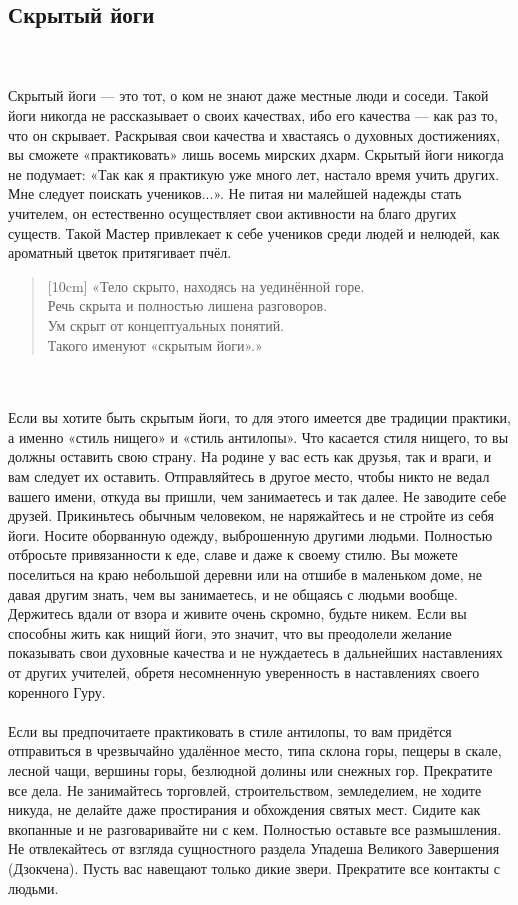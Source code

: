 \subsection{Скрытый йоги}
\\ \\ Скрытый йоги — это тот, о ком не знают даже местные люди и соседи. Такой йоги никогда не рассказывает о своих качествах, ибо его качества — как раз то, что он скрывает. Раскрывая свои качества и хвастаясь о духовных достижениях, вы сможете «практиковать» лишь восемь мирских дхарм. Скрытый йоги никогда не подумает: «Так как я практикую уже много лет, настало время учить других. Мне следует поискать учеников...». Не питая ни малейшей надежды стать учителем, он естественно осуществляет свои активности на благо других существ. Такой Мастер привлекает к себе учеников среди людей и нелюдей, как ароматный цветок притягивает пчёл.
\begin{verse}[10cm]
«Тело скрыто, находясь на уединённой горе. 
\\ Речь скрыта и полностью лишена разговоров. 
\\ Ум скрыт от концептуальных понятий. 
\\ Такого именуют «скрытым йоги».»
\end{verse}
\\ \\ Если вы хотите быть скрытым йоги, то для этого имеется две традиции практики, а именно «стиль нищего» и «стиль антилопы». Что касается стиля нищего, то вы должны оставить свою страну. На родине у вас есть как друзья, так и враги, и вам следует их оставить. Отправляйтесь в другое место, чтобы никто не ведал вашего имени, откуда вы пришли, чем занимаетесь и так далее. Не заводите себе друзей. Прикиньтесь обычным человеком, не наряжайтесь и не стройте из себя йоги. Носите оборванную одежду, выброшенную другими людьми. Полностью отбросьте привязанности к еде, славе и даже к своему стилю. Вы можете поселиться на краю небольшой деревни или на отшибе в маленьком доме, не давая другим знать, чем вы занимаетесь, и не общаясь с людьми вообще. Держитесь вдали от взора и живите очень скромно, будьте никем. Если вы способны жить как нищий йоги, это значит, что вы преодолели желание показывать свои духовные качества и не нуждаетесь в дальнейших наставлениях от других учителей, обретя несомненную уверенность в наставлениях своего коренного Гуру.
\newpage
\\ \\ Если вы предпочитаете практиковать в стиле антилопы, то вам придётся отправиться в чрезвычайно удалённое место, типа склона горы, пещеры в скале, лесной чащи, вершины горы, безлюдной долины или снежных гор. Прекратите все дела. Не занимайтесь торговлей, строительством, земледелием, не ходите никуда, не делайте даже простирания и обхождения святых мест. Сидите как вкопанные и не разговаривайте ни с кем. Полностью оставьте все размышления. Не отвлекайтесь от взгляда сущностного раздела Упадеша Великого Завершения (Дзокчена). Пусть вас навещают только дикие звери. Прекратите все контакты с людьми.
